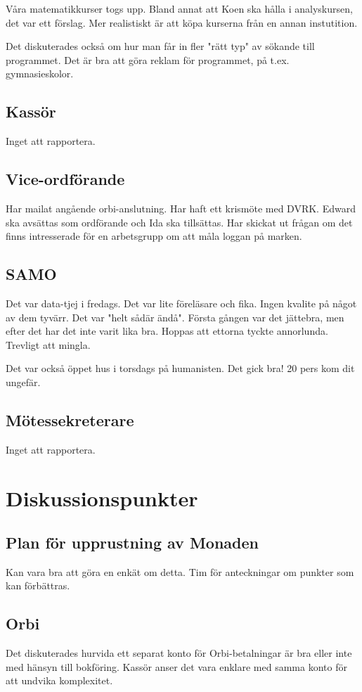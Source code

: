 \documentclass[protokoll]{dvd}
\begin{document}
Våra matematikkurser togs upp. Bland annat att Koen ska hålla i analyskursen, det var ett förslag. Mer realistiskt är att köpa kurserna från en annan instutition.

Det diskuterades också om hur man får in fler "rätt typ" av sökande till programmet. Det är bra att göra reklam för programmet, på t.ex. gymnasieskolor.


\subsection{Kassör}
Inget att rapportera.

\subsection{Vice-ordförande}
Har mailat angående orbi-anslutning. Har haft ett krismöte med DVRK. Edward ska avsättas som ordförande och Ida ska tillsättas.
Har skickat ut frågan om det finns intresserade för en arbetsgrupp om att måla loggan på marken.

\subsection{SAMO}
Det var data-tjej i fredags. Det var lite föreläsare och fika. Ingen kvalite på något av dem tyvärr. Det var "helt sådär ändå".
Första gången var det jättebra, men efter det har det inte varit lika bra. Hoppas att ettorna tyckte annorlunda. Trevligt att mingla.

Det var också öppet hus i torsdags på humanisten. Det gick bra! 20 pers kom dit ungefär.

\subsection{Mötessekreterare}
Inget att rapportera.

\newpage


\section{Diskussionspunkter}

\subsection*{Plan för upprustning av Monaden}
Kan vara bra att göra en enkät om detta. Tim för anteckningar om punkter som kan förbättras.

\subsection*{Orbi}
Det diskuterades hurvida ett separat konto för Orbi-betalningar är bra eller inte med hänsyn till bokföring.
Kassör anser det vara enklare med samma konto för att undvika komplexitet.
\end{document}
